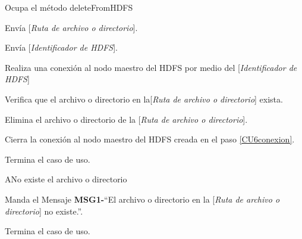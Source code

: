 
\begin{UCtrayectoria}

\UCpaso[\UCactor] Ocupa el método deleteFromHDFS

\UCpaso[\UCactor] Envía [{\em Ruta de archivo o directorio}].

\UCpaso[\UCactor] Envía [{\em Identificador de HDFS}].

\UCpaso[\UCsist] Realiza una conexión al nodo maestro del HDFS por medio del [{\em Identificador de HDFS}]\label{CU6conexion}

\UCpaso[\UCsist] Verifica que el archivo o directorio en la[{\em Ruta de archivo o directorio}] exista. 

\UCpaso[\UCsist] Elimina el archivo o directorio de la [{\em Ruta de archivo o directorio}].

\UCpaso[\UCsist] Cierra la conexión al nodo maestro del HDFS creada en el paso \ref{CU6conexion}.

\UCpaso[] Termina el caso de uso.

\end{UCtrayectoria}




\begin{UCtrayectoriaA}{A}{No existe el archivo o directorio}

	\UCpaso Manda el Mensaje {\bf MSG1-}``El archivo o directorio en la [{\em Ruta de archivo o directorio}] no existe.''.

	\UCpaso[] Termina el caso de uso.

\end{UCtrayectoriaA}




